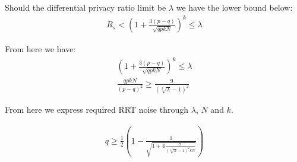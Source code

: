 \documentclass[11pt,draft]{article}
\begin{document}
Should the differential privacy ratio limit be $\lambda$ we have the lower bound below:
\begin{align}
R_s < \left ( 1 + \frac{3(p-q)}{\sqrt{qpkN}} \right )^k  \le \lambda
\end{align}

From here we have:
\begin{align}
\left ( 1 + \frac{3(p-q)}{\sqrt{qpkN}} \right )^k  \le \lambda \\
\frac{qpkN}{(p-q)^2} \ge  \frac{9}{(\sqrt[k]{\lambda} - 1)^2}
\end{align}

From here we express required RRT noise through $\lambda$, $N$ and $k$.

\begin{align}
q \ge \frac{1}{2} \left (1 -  \frac{1}{\sqrt{ 1 + 4 \frac{9}{(\sqrt[k]{\lambda} - 1)^2kN} } } \right ) 
\end{align}
\end{document}
